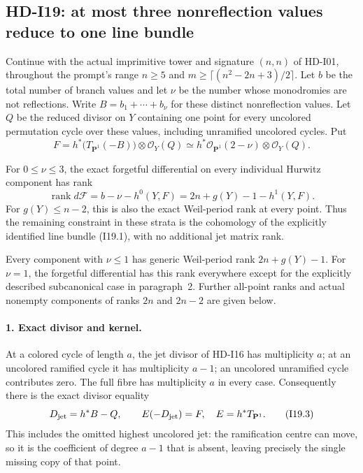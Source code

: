 \subsection{HD-I19: at most three nonreflection values reduce to one line bundle}
\label{sec:HD-I19}

Continue with the actual imprimitive tower and signature $(n,n)$
of HD-I01, throughout the prompt's range $n\geq5$ and
$m\geq\lceil(n^2-2n+3)/2\rceil$. Let $b$ be the total number
of branch values and let $\nu$ be the number whose monodromies
are not reflections. Write $B=b_1+\cdots+b_\nu$ for these
distinct nonreflection values. Let $Q$ be the reduced divisor on
$Y$ containing one point for every uncolored permutation cycle
over these values, including unramified uncolored cycles.
Put
\begin{equation}
 F=h^*\bigl(T_{\mathbf P^1}(-B)\bigr)\otimes\mathcal O_Y(Q)
       \simeq h^*\mathcal O_{\mathbf P^1}(2-\nu)
                                      \otimes\mathcal O_Y(Q).
                                                        \tag{I19.1}
\end{equation}

For $0\leq\nu\leq3$, the exact forgetful differential on every
individual Hurwitz component has rank
\begin{equation}
 \boxed{\operatorname{rank}d\mathcal F
       =b-\nu-h^0(Y,F)
       =2n+g(Y)-1-h^1(Y,F).}                           \tag{I19.2}
\end{equation}
For $g(Y)\leq n-2$, this is also the exact Weil-period rank at
every point. Thus the remaining constraint in these strata is
the cohomology of the explicitly identified line bundle (I19.1),
with no additional jet matrix rank.

Every component with $\nu\leq1$ has generic Weil-period rank
$2n+g(Y)-1$. For $\nu=1$, the forgetful differential has this
rank everywhere except for the explicitly described subcanonical
case in paragraph~2. Further all-point ranks and actual nonempty
components of ranks $2n$ and $2n-2$ are given below.

\paragraph{1. Exact divisor and kernel.}
At a colored cycle of length $a$, the jet divisor of HD-I16 has
multiplicity $a$; at an uncolored ramified cycle it has
multiplicity $a-1$; an uncolored unramified cycle contributes
zero. The full fibre has multiplicity $a$ in every case.
Consequently there is the exact divisor equality
\begin{equation}
            D_{\rm jet}=h^*B-Q,
       \qquad E(-D_{\rm jet})=F,\quad E=h^*T_{\mathbf P^1}.
                                                        \tag{I19.3}
\end{equation}
This includes the omitted highest uncolored jet: the ramification
centre can move, so it is the coefficient of degree $a-1$ that
is absent, leaving precisely the single missing copy of that point.

